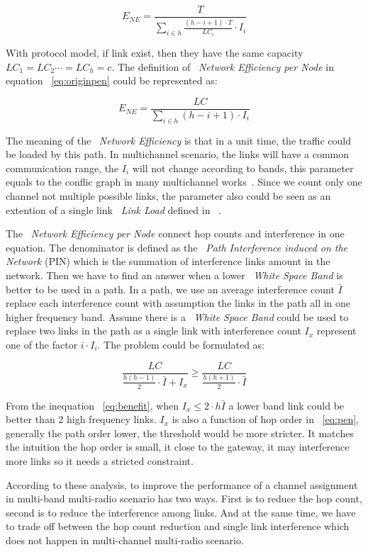\begin{equation}
\label{eq:originpen}
E_{NE}=\frac{T}{\sum_{i \in h}\frac{(h-i+1)\cdot T}{LC_i}\cdot I_i }
\end{equation}

With protocol model, if link exist, then they have the same capacity $LC_1=LC_2 \cdots =LC_h=c$. 
The definition of ~\emph{Network Efficiency per Node} in equation ~\ref{eq:originpen} could be represented as:


\begin{equation}
\label{eq:pen}
E_{NE}=\frac{LC}{\sum_{i \in h} (h-i+1)\cdot I_i}
\end{equation}
 

The meaning of the ~\emph{Network Efficiency} is that in a unit time, the traffic could be loaded by this path. 
In multichannel scenario, the links will have a common communication range, the $I_i$ will not change according to bands, this parameter equals to the conflic graph in many multichannel works~\cite{jain2005impact}. 
Since we count only one channel not multiple possible links, the parameter also could be seen as an extention of a single link ~\emph{Link Load} defined in ~\cite{raniwala2004centralized}.

The ~\emph{Network Efficiency per Node} connect hop counts and interference in one equation. The denominator is defined as the ~\emph{Path Interference induced on the Network} (PIN) which is the summation of interference links amount in the network.
Then we have to find an answer when a lower ~\emph{White Space Band} is better to be used in a path.
In a path, we use an average interference count $\bar{I}$ replace each interference count with assumption the links in the path all in one higher frequency band. 
Assume there is a ~\emph{White Space Band} could be used to replace two links in the path as a single link with interference count $I_x$ represent one of the factor $i\cdot I_i$. The problem could be formulated as:

 
\begin{equation}
\label{eq:benefit}
\frac{LC}{\frac{h(h-1)}{2}\cdot \bar{I}+I_x} \geq \frac{LC}{\frac{h(h+1)}{2}\cdot \bar{I}}
\end{equation}

From the inequation ~\ref{eq:benefit}, when $I_x \leq 2\cdot h\bar{I}$ a lower band link could be better than 2 high frequency links. 
$I_x$ is also a function of hop order in ~\ref{eq:pen}, generally the path order lower, the threshold would be more stricter.
It matches the intuition the hop order is small, it close to the gateway, it may interference more links so it needs a stricted constraint.

According to these analysis, to improve the performance of a channel assignment in multi-band multi-radio scenario has two ways. First is to reduce the hop count, second is to reduce the interference among links. And at the same time, we have to trade off between the hop count reduction and single link interference which does not happen in multi-channel multi-radio scenario.



